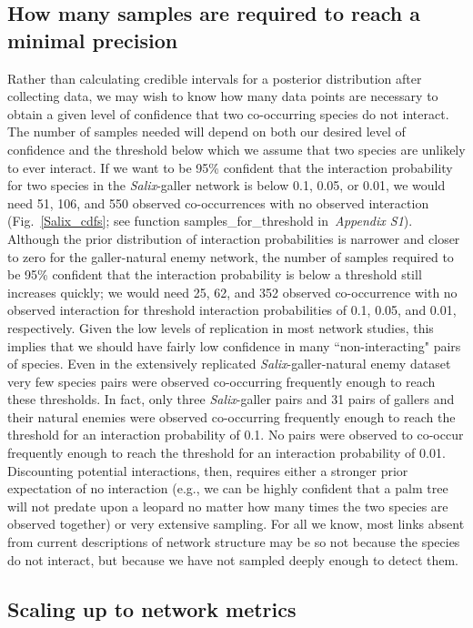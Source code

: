 \documentclass[12pt]{article}
\begin{document}
\begin{spacing}{2.0}
  \subsection*{How many samples are required to reach a minimal precision}

      Rather than calculating credible intervals for a posterior distribution after collecting data, we may wish to know how many data points are necessary to obtain a given level of confidence that two co-occurring species do not interact. The number of samples needed will depend on both our desired level of confidence and the threshold below which we assume that two species are unlikely to ever interact. If we want to be 95\% confident that the interaction probability for two species in the \emph{Salix}-galler network is below 0.1, 0.05, or 0.01, we would need 51, 106, and 550 observed co-occurrences with no observed interaction (Fig.~\ref{Salix_cdfs}; see function samples\_for\_threshold in~\emph{Appendix S1}). Although the prior distribution of interaction probabilities is narrower and closer to zero for the galler-natural enemy network, the number of samples required to be 95\% confident that the interaction probability is below a threshold still increases quickly; we would need 25, 62, and 352 observed co-occurrence with no observed interaction for threshold interaction probabilities of 0.1, 0.05, and 0.01, respectively. Given the low levels of replication in most network studies, this implies that we should have fairly low confidence in many ``non-interacting" pairs of species. Even in the extensively replicated \emph{Salix}-galler-natural enemy dataset very few species pairs were observed co-occurring frequently enough to reach these thresholds. In fact, only three \emph{Salix}-galler pairs and 31 pairs of gallers and their natural enemies were observed co-occurring frequently enough to reach the threshold for an interaction probability of 0.1. No pairs were observed to co-occur frequently enough to reach the threshold for an interaction probability of 0.01. Discounting potential interactions, then, requires either a stronger prior expectation of no interaction (e.g., we can be highly confident that a palm tree will not predate upon a leopard no matter how many times the two species are observed together) or very extensive sampling. For all we know, most links absent from current descriptions of network structure may be so not because the species do not interact, but because we have not sampled deeply enough to detect them.


  \subsection*{Scaling up to network metrics}


\end{spacing}
\end{document}
